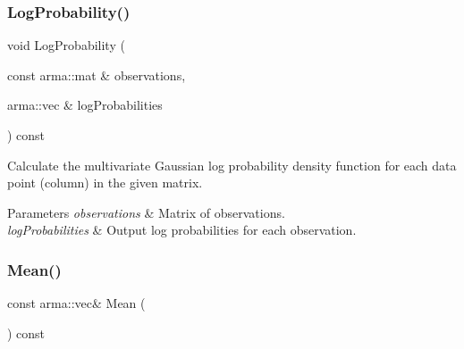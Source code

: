 \mbox{\label{classmlpack_1_1distribution_1_1DiagonalGaussianDistribution_a10aa8675001ec75323be892d23b4a2cb}} 
\subsubsection{Log\+Probability()\hspace{0.1cm}{\footnotesize\ttfamily [2/2]}}
{\footnotesize\ttfamily void Log\+Probability (\begin{DoxyParamCaption}\item[{const arma\+::mat \&}]{observations,  }\item[{arma\+::vec \&}]{log\+Probabilities }\end{DoxyParamCaption}) const}



Calculate the multivariate Gaussian log probability density function for each data point (column) in the given matrix. 


\begin{DoxyParams}{Parameters}
{\em observations} & Matrix of observations. \\
\hline
{\em log\+Probabilities} & Output log probabilities for each observation. \\
\hline
\end{DoxyParams}
\mbox{\label{classmlpack_1_1distribution_1_1DiagonalGaussianDistribution_a6db5f5d76cbd055347cecd9ca90eea86}} 
\subsubsection{Mean()\hspace{0.1cm}{\footnotesize\ttfamily [1/2]}}
{\footnotesize\ttfamily const arma\+::vec\& Mean (\begin{DoxyParamCaption}{ }\end{DoxyParamCaption}) const\hspace{0.3cm}{\ttfamily [inline]}}



